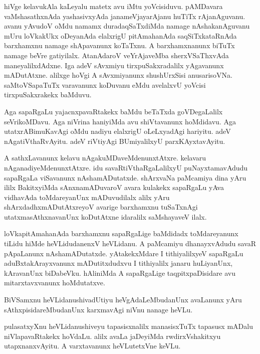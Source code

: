 \begin{mng}
hiVge kelavukAla kaLeyalu matetx avu iMtu yoVcisiduvu. pAMDavara vaMshasathxnAda yashasivxyAda janameVjayarAjanu huTiTx rAjanAguvanu. avanu yAvudoV oMdu namamx duradaqSaTxdiMda namage nAshakanAguvanu mUru loVkakUkx oDeyanAda elalxrigU pitAmahanAda saqSiTxkataRnAda barxhamxnu namage shApavanunx koTaTxnu. A barxhamxnanunx biTuTx namage beVre gatiyilalx. AtanAdaroV veYrAjaveMba sherxVSaThxvAda maneyalilxdAdxne. Iga adeV sAvxmiyu tirxpuSakxradalilx yAgavanunx mADutAtxne. alilxge hoVgi A sAvxmiyanunx shushUrxSisi anusarisoVNa. saMtoVSapaTuTx varavanunx koDuvanu eMdu avelalxvU yoVcisi tirxpuSakxrakekx baMduvu.
\end{mng}

\begin{mng}
Aga sapaRgaLu yajacnxpavaRtakekx baMdu beTaTxda goVDegaLalilx seVrikoMDavu. Aga niVrina haniyiMda avu shiVtavanunx hoMdidavu. Aga utatxrABimuKavAgi oMdu nadiyu elalxrigU oLeLxyadAgi hariyitu. adeV nAgatiVthaRvAyitu. adeV riVtiyAgi BUmiyalilxyU parxKAyxtavAyitu.
\end{mng}

\begin{mng}
A sathxLavanunx kelavu nAgakuMDaveMdenunxtAtxre. kelavaru nAganadiyeMdenunxtAtxre. idu savaRtiVthaRgaLalilxyU puNayxtamavAdudu sapaRgaLa viSavanunx nAshamADutatxde. shArxvaNa paMcamiya dina yAru ililx BakitxyiMda sAnxnamADuvaroV avara kulakekx sapaRgaLu yAva vidhavAda toMdareyanUnx mADuvudilalx alilx yAru shArxdadhxmADutAtxreyoV avarige barxhamxnu tuSaTxnAgi utatxmasAthxnavanUnx koDutAtxne idaralilx saMshayaveV ilalx.
\end{mng}

\begin{mng}
loVkapitAmahanAda barxhamxnu sapaRgaLige baMdidadx toMdareyanunx tiLidu hiMde heVLidudanenxV heVLidanu. A paMcamiyu dhanayxvAdudu savaR pApaLanunx nAshamADutatxde. yAtakekxMdare I tithiyalilxyeV sapaRgaLu aduBxtakArayxvanunx mADutitxdudxvu I tithiyalilx janaru huLiyanUnx, kAravanUnx biDabeVku. hAliniMda A sapaRgaLige taqpitxpaDisidare avu mitarxtavxvanunx hoMdutatxve.
\end{mng}

\begin{mng}
BiVSamxnu heVLidanu\mdash shivadUtiyu heVgAdaLeMbudanUnx avaLanunx yAru sAthxpisidareMbudanUnx karxmavAgi niVnu nanage heVLu.
\end{mng}

\begin{mng}
pulasatxyXnu heVLidanu\mdash shiveyu tapasisxnalilx manasisxTuTx tapasusx mADalu niVlapavaRtakekx hoVdaLu. alilx avaLa jaDeyiMda rwdirxVshakitxyu utapxnanxvAyitu. A varxtavanunx heVLutetxVne keVLu.
\end{mng}

